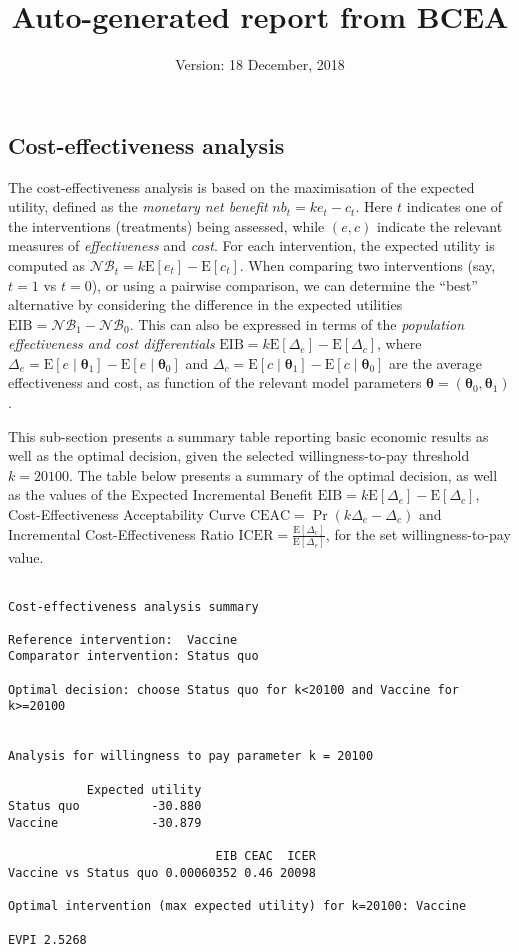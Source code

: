 \documentclass[]{article}
\title{Auto-generated report from BCEA}
\author{}
\date{Version: 18 December, 2018}
\begin{document}
\maketitle

\subsection{Cost-effectiveness
analysis}\label{cost-effectiveness-analysis}

The cost-effectiveness analysis is based on the maximisation of the
expected utility, defined as the \emph{monetary net benefit}
\(nb_t=ke_t-c_t\). Here \(t\) indicates one of the interventions
(treatments) being assessed, while \((e,c)\) indicate the relevant
measures of \emph{effectiveness} and \emph{cost}. For each intervention,
the expected utility is computed as
\(\mathcal{NB}_t=k\mbox{E}[e_t]-\mbox{E}[c_t]\). When comparing two
interventions (say, \(t=1\) vs \(t=0\)), or using a pairwise comparison,
we can determine the ``best'' alternative by considering the difference
in the expected utilities \(\mbox{EIB}=\mathcal{NB}_1-\mathcal{NB}_0\).
This can also be expressed in terms of the \emph{population
effectiveness and cost differentials}
\(\mbox{EIB}=k\mbox{E}[\Delta_e]-\mbox{E}[\Delta_c]\), where
\(\Delta_e=\mbox{E}[e\mid\bm\theta_1]-\mbox{E}[e\mid\bm\theta_0]\) and
\(\Delta_c=\mbox{E}[c\mid\bm\theta_1]-\mbox{E}[c\mid\bm\theta_0]\) are
the average effectiveness and cost, as function of the relevant model
parameters \(\bm\theta=(\bm\theta_0,\bm\theta_1)\).

This sub-section presents a summary table reporting basic economic
results as well as the optimal decision, given the selected
willingness-to-pay threshold \(k=20100\). The table below presents a
summary of the optimal decision, as well as the values of the Expected
Incremental Benefit
\(\mbox{EIB}=k\mbox{E}[\Delta_e]-\mbox{E}[\Delta_c]\),
Cost-Effectiveness Acceptability Curve
\(\mbox{CEAC}=\Pr(k\Delta_e-\Delta_c)\) and Incremental
Cost-Effectiveness Ratio
\(\mbox{ICER}=\displaystyle\frac{\mbox{E}[\Delta_c]}{\mbox{E}[\Delta_e]}\),
for the set willingness-to-pay value.

\begin{verbatim}

Cost-effectiveness analysis summary 

Reference intervention:  Vaccine
Comparator intervention: Status quo

Optimal decision: choose Status quo for k<20100 and Vaccine for k>=20100


Analysis for willingness to pay parameter k = 20100

           Expected utility
Status quo          -30.880
Vaccine             -30.879

                             EIB CEAC  ICER
Vaccine vs Status quo 0.00060352 0.46 20098

Optimal intervention (max expected utility) for k=20100: Vaccine
           
EVPI 2.5268
\end{verbatim}
\end{document}
